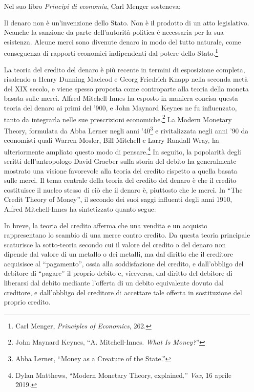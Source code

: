 \documentclass[
  a5paper,
  smalldemyvopaper,10pt,twoside,onecolumn,openright,extrafontsizes,hidelinks]{memoir}
\renewenvironment{quote}%
               {\list{}{\rightmargin=.6cm\leftmargin=.6cm}%
                \itshape \item[]}%
               {\endlist}
\begin{document}
Nel suo libro \emph{Principi di economia}, Carl Menger sosteneva:

\begin{quote}
Il denaro non è un'invenzione dello Stato. Non è il prodotto di un atto
legislativo. Neanche la sanzione da parte dell'autorità politica è
necessaria per la sua esistenza. Alcune merci sono divenute denaro in
modo del tutto naturale, come conseguenza di rapporti economici
indipendenti dal potere dello Stato.\footnote{Carl Menger,
  \emph{Principles of Economics}, 262.}
\end{quote}

La teoria del credito del denaro è più recente in termini di esposizione
completa, risalendo a Henry Dunning Macleod e Georg Friedrich Knapp
nella seconda metà del XIX secolo, e viene spesso proposta come
controparte alla teoria della moneta basata sulle merci. Alfred
Mitchell-Innes ha esposto in maniera concisa questa teoria del denaro ai
primi del '900, e John Maynard Keynes ne fu influenzato, tanto da
integrarla nelle sue prescrizioni economiche.\footnote{John Maynard
  Keynes, ``A. Mitchell-Innes. \emph{What Is Money?}''} La Modern
Monetary Theory, formulata da Abba Lerner negli anni '40\footnote{Abba
  Lerner, ``Money as a Creature of the State.''} e rivitalizzata negli
anni '90 da economisti quali Warren Mosler, Bill Mitchell e Larry
Randall Wray, ha ulteriormente ampliato questo modo di
pensare.\footnote{Dylan Matthews, ``Modern Monetary Theory, explained,''
  \emph{Vox}, 16 aprile 2019.} In seguito, la popolarità degli scritti
dell'antropologo David Graeber sulla storia del debito ha generalmente
mostrato una visione favorevole alla teoria del credito rispetto a
quella basata sulle merci. Il tema centrale della teoria del credito del
denaro è che il credito costituisce il nucleo stesso di ciò che il
denaro è, piuttosto che le merci. In ``The Credit Theory of Money'', il
secondo dei suoi saggi influenti degli anni 1910, Alfred Mitchell-Innes
ha sintetizzato quanto segue:

\begin{quote}
In breve, la teoria del credito afferma che una vendita e un acquisto
rappresentano lo scambio di una merce contro credito. Da questa teoria
principale scaturisce la sotto-teoria secondo cui il valore del credito
o del denaro non dipende dal valore di un metallo o dei metalli, ma dal
diritto che il creditore acquisisce al ``pagamento'', ossia alla
soddisfazione del credito, e dall'obbligo del debitore di ``pagare'' il
proprio debito e, viceversa, dal diritto del debitore di liberarsi dal
debito mediante l'offerta di un debito equivalente dovuto dal creditore,
e dall'obbligo del creditore di accettare tale offerta in sostituzione
del proprio credito.
\end{quote}
\end{document}

